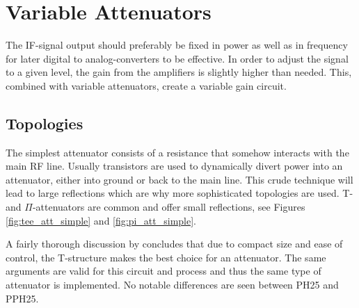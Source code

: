 \chapter{Variable Attenuators}\label{ch:vargain}

		The IF-signal output should preferably be fixed in power as well as in frequency for later digital to analog-converters to be effective. In order to adjust the signal to a given level, the gain from the amplifiers is slightly higher than needed. This, combined with variable attenuators, create a variable gain circuit.

	


	\section{Topologies}
		
		The simplest attenuator consists of a resistance that somehow interacts with the main RF line. Usually transistors are used to dynamically divert power into an attenuator, either into ground or back to the main line. This crude technique will lead to large reflections which are why more sophisticated topologies are used. T- and $\Pi$-attenuators are common and offer small reflections, see Figures \ref{fig:tee_att_simple} and \ref{fig:pi_att_simple}.


		
		A fairly thorough discussion by \citeauthor{gustavsson07} concludes that due to compact size and ease of control, the T-structure makes the best choice for an attenuator.\autocite{gustavsson07} The same arguments are valid for this circuit and process and thus the same type of attenuator is implemented. No notable differences are seen between PH25 and PPH25.

